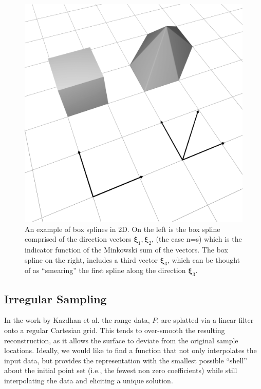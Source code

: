 \begin{figure}
  \centering
  \mbox{} \hfill
	\includegraphics[width=\linewidth]{figures/boxspline/2dex}
  \caption{\label{fig:box2d}%
  An example of box splines in 2D. On the left is the box spline comprised of the direction vectors $\mathbf{\xi}_1, \mathbf{\xi}_2$, (the case n=s) which is the indicator function of the Minkowski sum of the vectors. The box spline on the right, includes a third vector $\mathbf{\xi}_3$, which can be thought of as ``smearing'' the first spline along the direction $\mathbf{\xi}_3$.
  }
\end{figure}


\subsection{Irregular Sampling}
\label{sec:vari_review}
In the work by Kazdhan et al. \cite{fftk} the range data, $P$, are splatted via a linear filter onto a regular Cartesian grid. This tends to over-smooth the resulting reconstruction, as it allows the surface to deviate from the original sample locations. Ideally, we would like to find a function that not only interpolates the input data, but provides the representation with the smallest possible ``shell'' about the initial point set (i.e., the fewest non zero coefficients) while still interpolating the data and eliciting a unique solution. 

